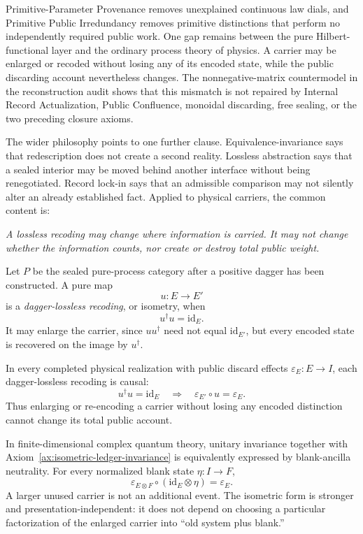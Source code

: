 Primitive-Parameter Provenance removes unexplained continuous law dials, and
Primitive Public Irredundancy removes primitive distinctions that perform no
independently required public work.  One gap remains between the pure
Hilbert-functional layer and the ordinary process theory of physics.  A carrier may
be enlarged or recoded without losing any of its encoded state, while the public
discarding account nevertheless changes.  The nonnegative-matrix countermodel in
the reconstruction audit shows that this mismatch is not repaired by Internal
Record Actualization, Public Confluence, monoidal discarding, free sealing, or the
two preceding closure axioms.

The wider philosophy points to one further clause.  Equivalence-invariance says
that redescription does not create a second reality.  Lossless abstraction says
that a sealed interior may be moved behind another interface without being
renegotiated.  Record lock-in says that an admissible comparison may not silently
alter an already established fact.  Applied to physical carriers, the common
content is:
\begin{center}
\emph{A lossless recoding may change where information is carried.  It may not
change whether the information counts, nor create or destroy total public weight.}
\end{center}

\begin{definition}
Let \(P\) be the sealed pure-process category after a positive dagger has been
constructed.  A pure map
\[
 u:E\longrightarrow E'
\]
is a \emph{dagger-lossless recoding}, or isometry, when
\[
 u^\dagger u=\mathrm{id}_E.
\]
It may enlarge the carrier, since \(uu^\dagger\) need not equal
\(\mathrm{id}_{E'}\), but every encoded state is recovered on the image by
\(u^\dagger\).
\end{definition}

\begin{axiom}
\label{ax:isometric-ledger-invariance}
In every completed physical realization with public discard effects
\(\varepsilon_E:E\to I\), each dagger-lossless recoding is causal:
\[
 \boxed{
 u^\dagger u=\mathrm{id}_E
 \quad\Longrightarrow\quad
 \varepsilon_{E'}\circ u=\varepsilon_E.}
\]
Thus enlarging or re-encoding a carrier without losing any encoded distinction
cannot change its total public account.
\end{axiom}

\begin{remark}
In finite-dimensional complex quantum theory, unitary invariance together with
Axiom~\ref{ax:isometric-ledger-invariance} is equivalently expressed by blank-ancilla
neutrality.  For every normalized blank state \(\eta:I\to F\),
\[
 \varepsilon_{E\otimes F}\circ
 (\mathrm{id}_E\otimes\eta)
 =\varepsilon_E.
\]
A larger unused carrier is not an additional event.  The isometric form is stronger
and presentation-independent: it does not depend on choosing a particular
factorization of the enlarged carrier into ``old system plus blank.''
\end{remark}

